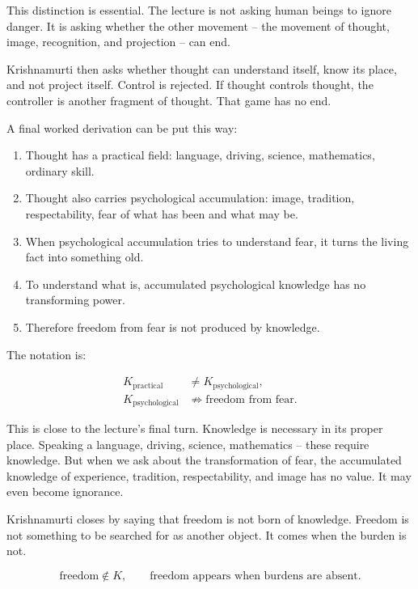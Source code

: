 This distinction is essential. The lecture is not asking human beings to ignore danger. It is asking whether the other movement -- the movement of thought, image, recognition, and projection -- can end.

Krishnamurti then asks whether thought can understand itself, know its place, and not project itself. Control is rejected. If thought controls thought, the controller is another fragment of thought. That game has no end.

A final worked derivation can be put this way:

\begin{enumerate}
\item Thought has a practical field: language, driving, science, mathematics, ordinary skill.
\item Thought also carries psychological accumulation: image, tradition, respectability, fear of what has been and what may be.
\item When psychological accumulation tries to understand fear, it turns the living fact into something old.
\item To understand what is, accumulated psychological knowledge has no transforming power.
\item Therefore freedom from fear is not produced by knowledge.
\end{enumerate}

The notation is:

\begin{align}
K_{\mathrm{practical}} &\neq K_{\mathrm{psychological}}, \\
K_{\mathrm{psychological}} &\not\Rightarrow \text{freedom from fear}.
\end{align}

This is close to the lecture's final turn. Knowledge is necessary in its proper place. Speaking a language, driving, science, mathematics -- these require knowledge. But when we ask about the transformation of fear, the accumulated knowledge of experience, tradition, respectability, and image has no value. It may even become ignorance.

Krishnamurti closes by saying that freedom is not born of knowledge. Freedom is not something to be searched for as another object. It comes when the burden is not.

\begin{equation}
\text{freedom} \notin K,
\qquad
\text{freedom appears when burdens are absent}.
\end{equation}

